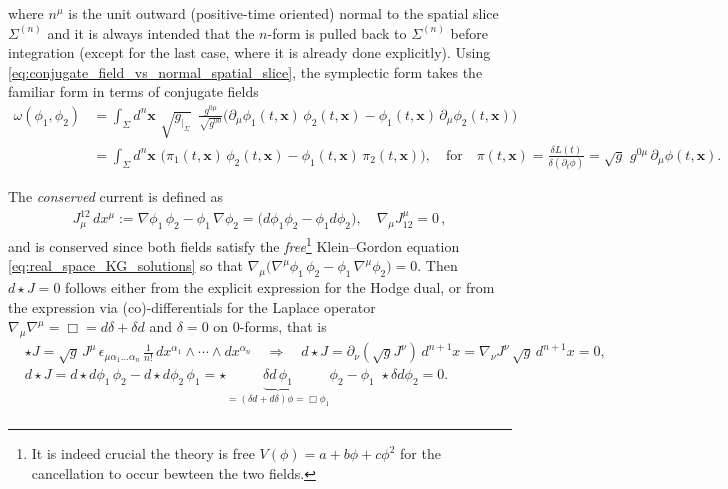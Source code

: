\documentclass[../QFT_main.tex]{subfiles}
\begin{document}
\begin{mytheorem}
\noindent
where $n^\mu$ is the unit outward (positive-time oriented) normal to the spatial slice $\Sigma^{(n)}$ and it is always intended that the $n$-form is pulled back to $\Sigma^{(n)}$ before integration (except for the last case, where it is already done explicitly). 
Using \eqref{eq:conjugate_field_vs_normal_spatial_slice}, the symplectic form takes the familiar form in terms of conjugate fields
{\small
\begin{align}
    \omega(\phi_1, \phi_2) &= 
    \int_\Sigma \!\!\! d^n\mathbf{x}\,\,\sqrt{g_{|_\Sigma}}\,\,\, \tfrac{g^{0\mu}}{\sqrt{g^{00}}} \Big( \partial_\mu \phi_1(t,\mathbf{x}) \,\phi_2(t,\mathbf{x}) - \phi_1(t,\mathbf{x})\, \partial_\mu \phi_2(t,\mathbf{x}) \Big)\\
    &=\int_\Sigma \!\!d^n\mathbf{x}\, \,\Big( \pi_1(t,\mathbf{x})\,\phi_2(t,\mathbf{x}) - \phi_1(t,\mathbf{x})\, \pi_2(t,\mathbf{x}) \Big), \quad\text{for}\quad \pi(t,\mathbf{x})=\frac{\delta L(t)}{\delta (\partial_t\phi)} = \sqrt{g}\, \,g^{0\mu}\, \partial_\mu \phi(t,\mathbf{x}).
\end{align}}

The \emph{conserved} current is defined as
\begin{align}
    J^{12}_\mu \, dx^\mu:= \nabla \phi_1 \, \phi_2 - \phi_1 \, \nabla \phi_2 = \big(d\phi_1\phi_2 - \phi_1 d\phi_2\big), \quad \nabla_\mu J^\mu_{12} = 0\,,
\end{align}
and is conserved since both fields satisfy the \emph{free}\footnote{It is indeed crucial the theory is free $V(\phi)=a+b\phi+c\phi^2$ for the cancellation to occur bewteen the two fields.} Klein--Gordon equation \eqref{eq:real_space_KG_solutions} so that $\nabla_\mu \big(\nabla^\mu \phi_1 \, \phi_2 - \phi_1 \, \nabla^\mu \phi_2\big)=0$.
Then $d\star J=0$ follows either from the explicit expression for the Hodge dual, or from the expression via (co)-differentials for the Laplace operator $\nabla_\mu\nabla^\mu=\Box = d\delta + \delta d$ and $\delta =0$ on 0-forms, that is
\begin{align}
  &\star J = \sqrt{g}\, J^\mu \,\epsilon_{\mu\alpha_1\dots\alpha_n} \,\frac{1}{n!} \,dx^{\alpha_1}\wedge \cdots \wedge dx^{\alpha_n} \quad \Rightarrow \quad d\star J = \partial_\nu(\sqrt{g} J^\nu)\,d^{n+1}\!x  =  \nabla_\nu J^\nu\,\sqrt{g}\, d^{n+1}\!x =0,\\[3pt]
  &d \star J = d \star d\phi_1 \, \phi_2 - d \star d\phi_2 \, \phi_1 = \star\!\!\!\!\!\!\!\!\!\underbrace{\delta d\,\phi_1}_{=(\delta d+d\delta)\phi = \Box \phi_1}\!\!\!\!\!\!\!\!\!\phi_2 -\phi_1\,\, \star\delta d\phi_2 =0.\\
\end{align}
\vspace{-7mm}


\end{mytheorem}
\end{document}
